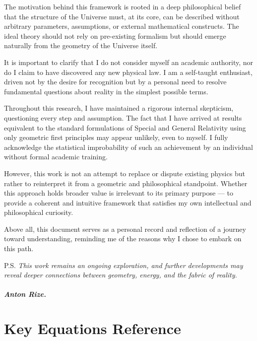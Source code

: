 \documentclass{article}
\begin{document}
The motivation behind this framework is rooted in a deep philosophical belief that the structure of the Universe must, at its core, can be described without arbitrary parameters, assumptions, or external mathematical constructs. The ideal theory should not rely on pre-existing formalism but should emerge naturally from the geometry of the Universe itself.

It is important to clarify that I do not consider myself an academic authority, nor do I claim to have discovered any new physical law. I am a self-taught enthusiast, driven not by the desire for recognition but by a personal need to resolve fundamental questions about reality in the simplest possible terms.

Throughout this research, I have maintained a rigorous internal skepticism, questioning every step and assumption. The fact that I have arrived at results equivalent to the standard formulations of Special and General Relativity using only geometric first principles may appear unlikely, even to myself. I fully acknowledge the statistical improbability of such an achievement by an individual without formal academic training.

However, this work is not an attempt to replace or dispute existing physics but rather to reinterpret it from a geometric and philosophical standpoint. Whether this approach holds broader value is irrelevant to its primary purpose — to provide a coherent and intuitive framework that satisfies my own intellectual and philosophical curiosity.

Above all, this document serves as a personal record and reflection of a journey toward understanding, reminding me of the reasons why I chose to embark on this path.


P.S. \textit{This work remains an ongoing exploration, and further developments may reveal deeper connections between geometry, energy, and the fabric of reality.
}

                                                                                                                                                               \subparagraph{\textit{Anton Rize.}}
                                                                                                                                                               

\section{Key Equations Reference}
\end{document}
